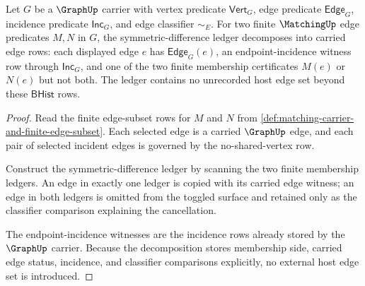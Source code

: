 \begin{theorem}
\label{thm:matching-augmentation-symmetric-difference-decomposition}
Let $G$ be a $\GraphUp$ carrier with vertex predicate $\mathsf{Vert}_G$, edge
predicate $\mathsf{Edge}_G$, incidence predicate $\mathsf{Inc}_G$, and edge
classifier $\sim_E$. For two finite $\MatchingUp$ edge predicates $M,N$ in
$G$, the symmetric-difference ledger decomposes into carried edge rows:
each displayed edge $e$ has $\mathsf{Edge}_G(e)$, an endpoint-incidence
witness row through $\mathsf{Inc}_G$, and one of the two finite membership
certificates $M(e)$ or $N(e)$ but not both. The ledger contains no unrecorded
host edge set beyond these $\mathsf{BHist}$ rows.
\end{theorem}
\begin{proof}
Read the finite edge-subset rows for $M$ and $N$ from
\autoref{def:matching-carrier-and-finite-edge-subset}. Each selected edge is a
carried $\GraphUp$ edge, and each pair of selected incident edges is governed
by the no-shared-vertex row.

Construct the symmetric-difference ledger by scanning the two finite
membership ledgers. An edge in exactly one ledger is copied with its carried
edge witness; an edge in both ledgers is omitted from the toggled surface and
retained only as the classifier comparison explaining the cancellation.

The endpoint-incidence witnesses are the incidence rows already stored by the
$\GraphUp$ carrier. Because the decomposition stores membership side, carried
edge status, incidence, and classifier comparisons explicitly, no external
host edge set is introduced.
\end{proof}


